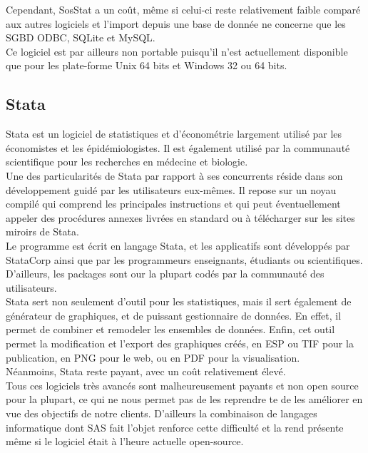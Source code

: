 \documentclass[a4paper,10pt]{report}
\begin{document}
Cependant, SosStat a un coût, même si celui-ci reste relativement faible comparé aux autres logiciels et l’import depuis une base de donnée ne concerne que les SGBD ODBC, SQLite et MySQL.\\
Ce logiciel est par ailleurs non portable puisqu’il n’est actuellement disponible que pour les plate-forme Unix 64 bits et Windows 32 ou 64 bits.

\subsection{Stata}

Stata est un logiciel de statistiques et d’économétrie largement utilisé par les économistes et les épidémiologistes. Il est également utilisé par la communauté scientifique pour les recherches en médecine et biologie.\\

Une des particularités de Stata par rapport à ses concurrents réside dans son développement guidé par les utilisateurs eux-mêmes. Il repose sur un noyau compilé qui comprend les principales instructions et qui peut éventuellement appeler des procédures annexes livrées en standard ou à télécharger sur les sites miroirs de Stata.\\ 
Le programme est écrit en langage Stata, et les applicatifs sont développés par StataCorp ainsi que par les programmeurs enseignants, étudiants ou scientifiques. D'ailleurs, les packages sont our la plupart codés par la communauté des utilisateurs. \\

Stata sert non seulement d’outil pour les statistiques, mais il sert également de générateur de graphiques, et de puissant gestionnaire de données. En effet, il permet de combiner et remodeler les ensembles de données. 
Enfin, cet outil permet la modification et l'export des graphiques créés, en ESP ou TIF pour la publication, en PNG pour le web, ou en PDF pour la visualisation.\\

Néanmoins, Stata reste payant, avec un coût relativement élevé.\\

Tous ces logiciels très avancés sont malheureusement payants et non open source pour la plupart, ce qui ne nous permet pas de les reprendre te de les améliorer en vue des objectifs de notre clients. D’ailleurs la combinaison de langages informatique dont SAS fait l’objet renforce cette difficulté et la rend présente même si le logiciel était à l’heure actuelle open-source.\\
\end{document}
